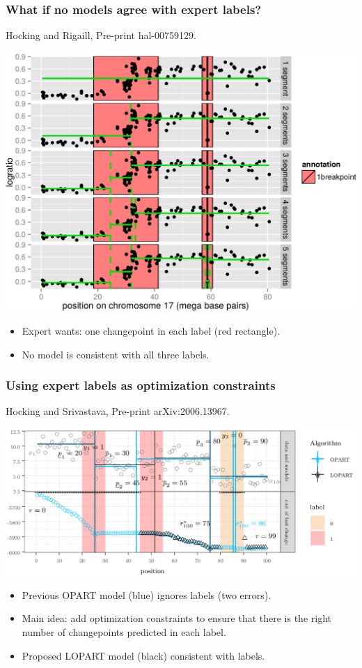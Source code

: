 \documentclass{beamer}
\begin{document}
\begin{frame}
  \frametitle{What if no models agree with expert labels?}
  Hocking and Rigaill, Pre-print hal-00759129.

  \includegraphics[width=0.8\linewidth]{SegAnnot-motivation}

  \begin{itemize}
  \item Expert wants: one changepoint in each label (red rectangle).
  \item No model is consistent with all three labels.
  \end{itemize}
\end{frame}

\begin{frame}
  \frametitle{Using expert labels as optimization constraints}
  Hocking and Srivastava, Pre-print arXiv:2006.13967.

  \includegraphics[width=\linewidth]{LOPART-notation}

  \begin{itemize}
  \item Previous OPART model (blue) ignores labels (two errors).
  \item Main idea: add optimization constraints to ensure that there
    is the right number of changepoints predicted in each label.
  \item Proposed LOPART model (black) consistent with labels.
  \end{itemize}
\end{frame}
\end{document}
